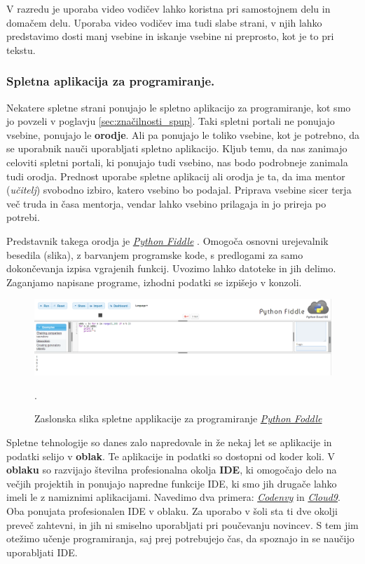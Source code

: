 V razredu je uporaba video vodičev lahko koristna pri samostojnem delu
in domačem delu. Uporaba video vodičev ima tudi slabe strani, v njih
lahko predstavimo dosti manj vsebine in iskanje vsebine ni
preprosto, kot je to pri tekstu.


\subsubsection{Spletna aplikacija za programiranje.}
\label{sec:spletna_app_programiranje}

Nekatere spletne strani ponujajo le spletno aplikacijo za
programiranje, kot smo jo povzeli v poglavju
\ref{sec:značilnosti_spup}. Taki spletni portali ne ponujajo vsebine,
ponujajo le \textbf{orodje}. Ali pa ponujajo le toliko vsebine, kot je
potrebno, da se uporabnik nauči uporabljati spletno aplikacijo. Kljub
temu, da nas zanimajo celoviti spletni portali, ki ponujajo tudi
vsebino, nas bodo podrobneje zanimala tudi orodja. Prednost uporabe
spletne aplikacij ali orodja je ta, da ima mentor (\emph{učitelj})
svobodno izbiro, katero vsebino bo podajal. Priprava vsebine sicer
terja več truda in časa mentorja, vendar lahko vsebino prilagaja in jo
prireja po potrebi.

Predstavnik takega orodja je
\emph{\href{http://pythonfiddle.com/}{Python Fiddle}}
\cite{web:pythonfiddle}. Omogoča osnovni urejevalnik besedila (slika), z
barvanjem programske kode, s predlogami za samo dokončevanja izpisa
vgrajenih funkcij. Uvozimo lahko datoteke in jih delimo. Zaganjamo
napisane programe, izhodni podatki se izpišejo v konzoli.

\begin{figure}[h]
    \includegraphics [width=1\linewidth, keepaspectratio =
    1] {./images/sc_web/PythonFiddle_01.png}
    \caption{Zaslonska slika spletne applikacije za programiranje
      \emph{\href{http://pythonfiddle.com/}{Python Foddle}}
      \cite{web:pythonfiddle}}.
    \label{fig:scr:web:PyFiddle}
\end{figure}

Spletne tehnologije so danes zalo napredovale in že nekaj let se
aplikacije in podatki selijo v \textbf{oblak}. Te aplikacije in
podatki so dostopni od koder koli. V \textbf{oblaku} so razvijajo
številna profesionalna okolja \textbf{IDE}, ki omogočajo delo na
večjih projektih in ponujajo napredne funkcije IDE, ki smo jih drugače
lahko imeli le z namiznimi aplikacijami. Navedimo dva primera:
\emph{\href{https://codenvy.com/}{Codenvy}} \cite{web:codeenvy} in
\emph{\href{https://c9.io/}{Cloud9}}\cite{web:cloud9}. Oba ponujata
profesionalen IDE v oblaku. Za uporabo v šoli sta ti dve okolji preveč
zahtevni, in jih ni smiselno uporabljati pri poučevanju novincev. S
tem jim otežimo učenje programiranja, saj prej potrebujejo čas, da
spoznajo in se naučijo uporabljati IDE.


